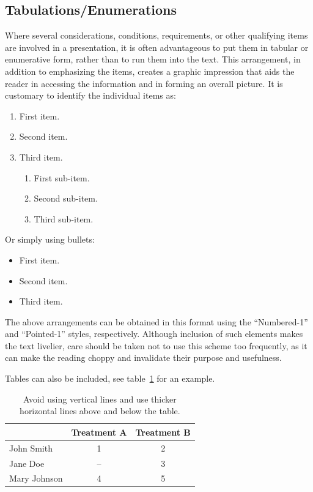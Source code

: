 \documentclass[bibtex,pagenumbers]{stabs2021}
\begin{document}
\subsection{Tabulations/Enumerations}

Where several considerations, conditions, requirements, or other
qualifying items are involved in a presentation, it is often
advantageous to put them in tabular or enumerative form, rather than
to run them into the text. This arrangement, in addition to
emphasizing the items, creates a graphic impression that aids the
reader in accessing the information and in forming an overall picture.
It is customary to identify the individual items as:
\begin{enumerate}
  \item First item.
  \item Second item.
  \item Third item.
    \begin{enumerate}
      \item First sub-item.
      \item Second sub-item.
      \item Third sub-item.
    \end{enumerate}
\end{enumerate}
Or simply using bullets:
\begin{itemize}
  \item First item.
  \item Second item.
  \item Third item.
\end{itemize}
The above arrangements can be obtained in this format using the
``Numbered-1'' and ``Pointed-1'' styles, respectively. Although
inclusion of such elements makes the text livelier, care should be
taken not to use this scheme too frequently, as it can make the
reading choppy and invalidate their purpose and usefulness.

Tables can also be included, see table~\ref{tbl:example-table} for an
example.

\begin{table}[ht]
  \centering
  \caption{Avoid using vertical lines and use thicker horizontal lines
    above and below the table.}
  \label{tbl:example-table}
  \begin{tabular}[t]{lcc}
    \toprule
    & Treatment A & Treatment B \\
    \midrule
    John Smith   &  1 & 2 \\
    Jane Doe     & -- & 3 \\
    Mary Johnson &  4 & 5 \\
    \bottomrule
  \end{tabular}
\end{table}
\end{document}
